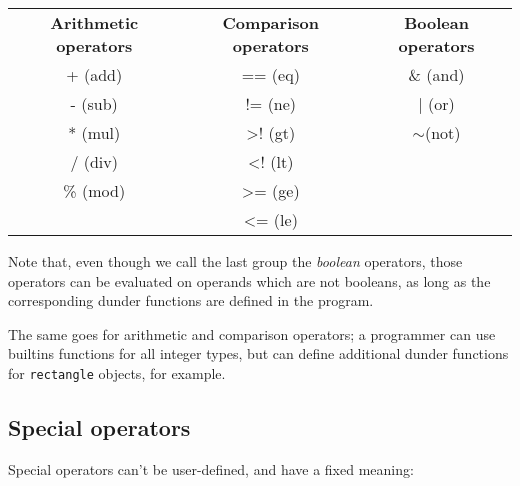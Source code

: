 \documentclass[times, utf8, diplomski]{fer}
\theoremstyle{definition}
\begin{document}
\begin{table}[H]
\begin{tabular}{ccc}
\textbf{Arithmetic operators} & \textbf{Comparison operators} & \textbf{Boolean operators} \\
+ (add)                       & == (eq)                       & \& (and)                   \\
- (sub)                       & != (ne)                       & | (or)                     \\
* (mul)                       & \textgreater{}! (gt)          & $\sim$(not)                \\
/ (div)                       & \textless{}! (lt)             &                            \\
\% (mod)                      & \textgreater{}= (ge)          &                            \\
                              & \textless{}= (le)             &                           
\end{tabular}
\end{table}

Note that, even though we call the last group the \textit{boolean} operators,
those operators can be evaluated on operands which are not booleans,
as long as the corresponding dunder functions are defined in the program.

The same goes for arithmetic and comparison operators; a programmer can use
builtins functions for all integer types, but can define additional dunder functions
for \texttt{rectangle} objects, for example.

\subsection{Special operators}

Special operators can't be user-defined, and have a fixed meaning:
\end{document}
